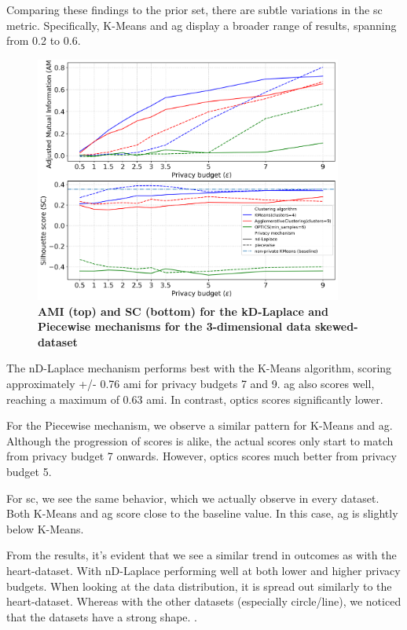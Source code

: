 {Comparing these findings to the prior set, there are subtle variations in the \gls{sc} metric. Specifically, K-Means and \gls{ag} display a broader range of results, spanning from 0.2 to 0.6.

\newpage
\begin{figure}[H]
  \centering

  \caption{\textbf{AMI (top) and SC (bottom) for the kD-Laplace and Piecewise mechanisms for the 3-dimensional data skewed-dataset}}
  \includegraphics[width=0.9\textwidth]{Results/nd-laplace/nd-Laplace/skewed-dataset/ami-and-sc_3_dimensions.png}

  \label{fig:validation-skewed-dataset_comparison_3d-laplace}
\end{figure}
The nD-Laplace mechanism performs best with the K-Means algorithm, scoring approximately +/- 0.76 \gls{ami} for privacy budgets 7 and 9. \gls{ag} also scores well, reaching a maximum of 0.63 \gls{ami}. In contrast, \gls{optics} scores significantly lower.

For the Piecewise mechanism, we observe a similar pattern for K-Means and \gls{ag}. Although the progression of scores is alike, the actual scores only start to match from privacy budget 7 onwards. However, \gls{optics} scores much better from privacy budget 5.

For \gls{sc}, we see the same behavior, which we actually observe in every dataset. Both K-Means and \gls{ag} score close to the baseline value. In this case, \gls{ag} is slightly below K-Means.

From the results, it's evident that we see a similar trend in outcomes as with the heart-dataset. With nD-Laplace performing well at both lower and higher privacy budgets. When looking at the data distribution, it is spread out similarly to the heart-dataset. Whereas with the other datasets (especially circle/line), we noticed that the datasets have a strong shape.
.

}
